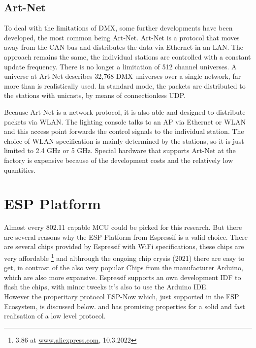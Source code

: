 \subsection*{Art-Net}
\label{sec:artnet}

To deal with the limitations of DMX, some further developments have been developed, the most common being Art-Net.
Art-Net is a protocol that moves away from the CAN bus and distributes the data via Ethernet in an \ac{LAN}.
The approach remains the same, the individual stations are controlled with a constant update frequency.
There is no longer a limitation of 512 channel universes.
A universe at Art-Net describes 32,768 DMX universes over a single network, far more than is realistically used.
In standard mode, the packets are distributed to the stations with unicasts, by means of connectionless \ac{UDP}.

Because Art-Net is a network protocol, it is also able and designed to distribute packets via WLAN.
The lighting console talks to an \ac{AP} via Ethernet or WLAN 
and this access point forwards the control signals to the individual station.
The choice of WLAN specification is mainly determined by the stations,
so it is just limited to 2.4 GHz or 5 GHz.
Special hardware that supports Art-Net at the factory is expensive
because of the development costs and the relatively low quantities.

\section{ESP Platform}

Almost every 802.11 capable \ac{MCU} could be picked for this research.
But there are several reasons why the ESP Platform from Espressif is a valid choice.
There are several chips provided by Espressif with WiFi specifications, these chips are very affordable
\footnote{3.86 at \url{www.aliexpress.com}, 10.3.2022}
and althrough the ongoing chip crysis (2021) there are easy to get, in contrast of the also very popular Chips from the manufacturer Arduino, which are also more expansive.
Espressif supports an own development IDF to flash the chips, with minor tweeks it's also to use the Arduino IDE.\\
However the properitary protocol ESP-Now which, just supported in the ESP Ecosystem, is discussed below.
and has promising properties for a solid and fast realisation of a low level protocol.


